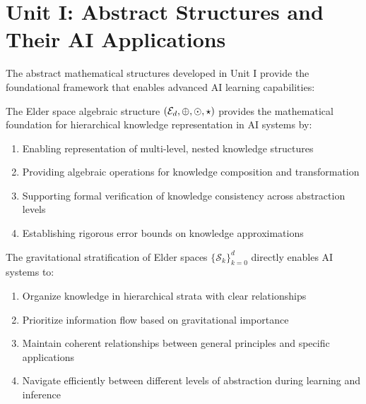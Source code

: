 \section{Unit I: Abstract Structures and Their AI Applications}

The abstract mathematical structures developed in Unit I provide the foundational framework that enables advanced AI learning capabilities:

\begin{theorem}
\label{thm:elder_spaces_ai_applications}
The Elder space algebraic structure $(\mathcal{E}_{d}, \oplus, \odot, \star)$ provides the mathematical foundation for hierarchical knowledge representation in AI systems by:
\begin{enumerate}
    \item Enabling representation of multi-level, nested knowledge structures
    \item Providing algebraic operations for knowledge composition and transformation
    \item Supporting formal verification of knowledge consistency across abstraction levels
    \item Establishing rigorous error bounds on knowledge approximations
\end{enumerate}
\end{theorem}

\begin{theorem}
\label{thm:gravitational_stratification_ai}
The gravitational stratification of Elder spaces $\{\mathcal{S}_k\}_{k=0}^d$ directly enables AI systems to:
\begin{enumerate}
    \item Organize knowledge in hierarchical strata with clear relationships
    \item Prioritize information flow based on gravitational importance
    \item Maintain coherent relationships between general principles and specific applications
    \item Navigate efficiently between different levels of abstraction during learning and inference
\end{enumerate}
\end{theorem}

